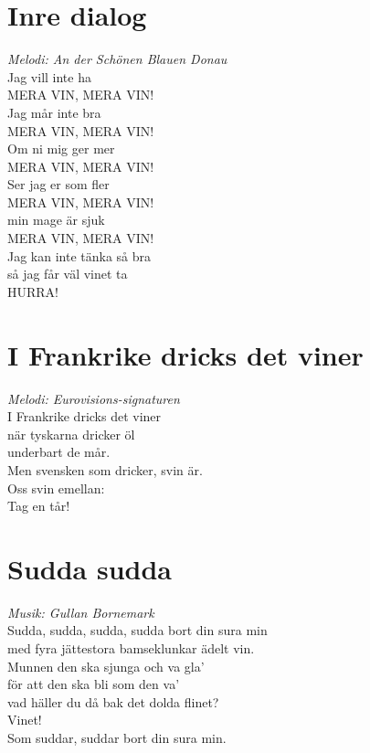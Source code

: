 \section{Inre dialog}
\textit{Melodi: An der Schönen Blauen Donau }
\vspace{2mm}\\
Jag vill inte ha\\
MERA VIN, MERA VIN!\\
Jag mår inte bra\\
MERA VIN, MERA VIN!\\
Om ni mig ger mer\\
MERA VIN, MERA VIN!\\
Ser jag er som fler\\
MERA VIN, MERA VIN!\\
min mage är sjuk\\
MERA VIN, MERA VIN!\\
Jag kan inte tänka så bra\\
så jag får väl vinet ta\\
HURRA!

\section{I Frankrike dricks det viner}
\textit{Melodi: Eurovisions-signaturen}
\vspace{2mm}\\
I Frankrike dricks det viner\\
när tyskarna dricker öl\\
underbart de mår.\\
Men svensken som dricker, svin är.\\
Oss svin emellan:\\
Tag en tår!

\section{Sudda sudda}
\textit{Musik: Gullan Bornemark}
\vspace{2mm}\\
Sudda, sudda, sudda, sudda bort din sura min\\
med fyra jättestora bamseklunkar ädelt vin.\\
Munnen den ska sjunga och va gla'\\
för att den ska bli som den va'\\
vad häller du då bak det dolda flinet?\\
Vinet!\\
Som suddar, suddar bort din sura min.

